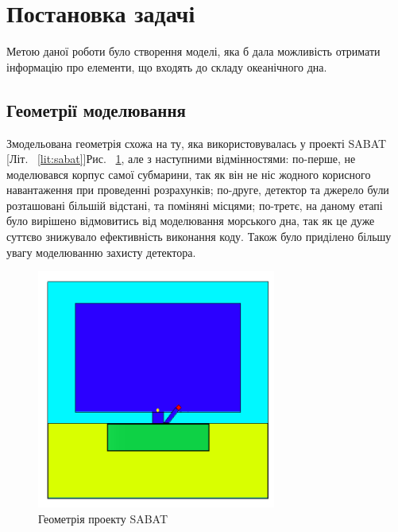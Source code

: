 \documentclass[a4paper, 14pt]{article}
\numberwithin{equation}{section}
\numberwithin{table}{section}
\begin{document}
\section{Постановка задачі}
\setcounter{figure}{0}
Метою даної роботи було створення моделі, яка б дала можливість отримати інформацію про елементи, що входять до складу океанічного дна.
\subsection {Геометрії моделювання}
Змодельована геометрія схожа на ту, яка використовувалась у проекті SABAT [Літ. ~\ref{lit:sabat}]Рис. ~\ref{ris:SabatG}, але з наступними відмінностями: по-перше, не моделювався корпус самої субмарини, так як він не ніс жодного корисного навантаження при проведенні розрахунків; по-друге, детектор та джерело були розташовані більшій відстані, та поміняні місцями; по-третє, на даному етапі було вирішено відмовитись від моделювання морського дна, так як це дуже суттєво знижувало ефективність виконання коду. Також було приділено більшу увагу моделюванню захисту детектора.
\begin{figure}[!hbt]
	\centering \includegraphics[width=0.7\textwidth]{images/sabatGeometry.png}
	\caption{Геометрія проекту SABAT} 
	\label{ris:SabatG}	
\end{figure}
\end{document}
